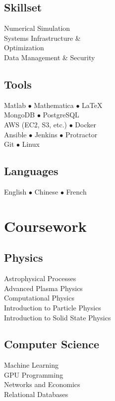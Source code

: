 \documentclass[]{yubo-resume-openfont}
\begin{document}
\begin{minipage}[t]{0.33\textwidth}
    \subsection{Skillset}
    Numerical Simulation\\
    Systems Infrastructure \&\\
        \tab Optimization\\
    Data Management \& Security
    \sectionsep
    \subsection{Tools}
    Matlab $\bullet$ Mathematica $\bullet$ \LaTeX\\
    MongoDB $\bullet$ PostgreSQL \\
    AWS (EC2, S3, etc.) $\bullet$ Docker\\
    Ansible $\bullet$ Jenkins $\bullet$ Protractor\\
    Git $\bullet$ Linux\\
    \sectionsep
    \subsection{Languages}
    English $\bullet$ Chinese $\bullet$ French
    \sectionsep




\section{Coursework}
    \subsection{Physics}
        Astrophysical Processes\\
        Advanced Plasma Physics\\
        Computational Physics\\
        Introduction to Particle Physics\\
        Introduction to Solid State Physics\\
    \sectionsep

    \subsection{Computer Science}
        Machine Learning\\
        GPU Programming\\
        Networks and Economics\\
        Relational Databases
    \sectionsep


\end{minipage}
\end{document}
